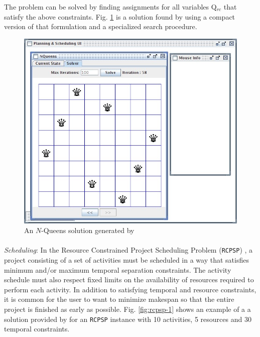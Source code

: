 {The problem can be solved by finding assignments for all variables
Q$_{rc}$ that satisfy the above constraints. Fig. \ref{fig:nqueens-2}
is a solution found by \eu using a compact version of that formulation
and a specialized search procedure.

\begin{figure}
\centering
\includegraphics[scale=0.3]{figs/Example-NQueens1.jpg}
\caption{\small An $N$-Queens solution generated by \eu}
\label{fig:nqueens-2}
\end{figure}


\paragraph{} \textit{Scheduling}: In the Resource Constrained Project
Scheduling Problem (\texttt{RCPSP}) \cite{Bruckera99}, a project
consisting of a set of activities must be scheduled in a way that
satisfies minimum and/or maximum temporal separation constraints. The
activity schedule must also respect fixed limits on the availability
of resources required to perform each activity. In addition to
satisfying temporal and resource constraints, it is common for the
user to want to minimize makespan \cite{ghallab04} so that the entire
project is finished as early as possible. Fig. \ref{fig:rcpsp-1} shows
an example of a a solution provided by \eu for an \texttt{RCPSP}
instance with 10 activities, 5 resources and 30 temporal constraints.

}
